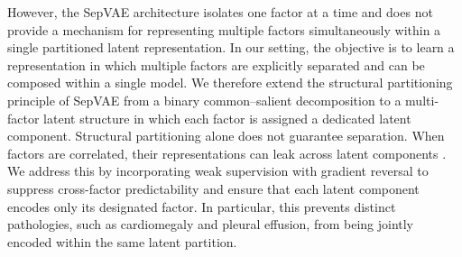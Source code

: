 However, the SepVAE architecture isolates one factor at a time and does not provide a mechanism for representing multiple factors simultaneously within a single partitioned latent representation.
In our setting, the objective is to learn a representation in which multiple factors are explicitly separated and can be composed within a single model. 
We therefore extend the structural partitioning principle of SepVAE from a binary common–salient decomposition to a multi-factor latent structure in which each factor is assigned a dedicated latent component.
Structural partitioning alone does not guarantee separation. 
When factors are correlated, their representations can leak across latent components \citep{attribute_disentanglement}. 
We address this by incorporating weak supervision with gradient reversal to suppress cross-factor predictability and ensure that each latent component encodes only its designated factor. 
In particular, this prevents distinct pathologies, such as cardiomegaly and pleural effusion, from being jointly encoded within the same latent partition.


